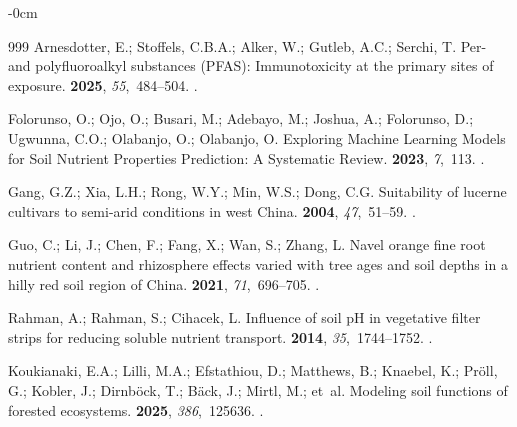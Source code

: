 \documentclass[environremediat,article,accept,pdftex,oneauthor]{Definitions/mdpi}
\begin{document}
\begin{adjustwidth}{-\extralength}{0cm}
\begin{thebibliography}{999}
Arnesdotter, E.; Stoffels, C.B.A.; Alker, W.; Gutleb, A.C.; Serchi, T.
\newblock Per- and polyfluoroalkyl substances (PFAS): Immunotoxicity at the
  primary sites of exposure.
 {\bf 2025}, {\em 55},~484--504.
.

Folorunso, O.; Ojo, O.; Busari, M.; Adebayo, M.; Joshua, A.; Folorunso, D.;
  Ugwunna, C.O.; Olabanjo, O.; Olabanjo, O.
\newblock Exploring Machine Learning Models for Soil Nutrient Properties
  Prediction: A Systematic Review.
 {\bf 2023}, {\em 7},~113.
.

Gang, G.Z.; Xia, L.H.; Rong, W.Y.; Min, W.S.; Dong, C.G.
\newblock Suitability of lucerne cultivars to semi-arid conditions in west
  China.
 {\bf 2004}, {\em
  47},~51--59.
.

Guo, C.; Li, J.; Chen, F.;  Fang, X.; Wan, S.; Zhang, L.
\newblock Navel orange fine root nutrient content and rhizosphere effects
  varied with tree ages and soil depths in a hilly red soil region of China.
 {\bf 2021}, {\em
  71},~696--705.
.

Rahman, A.; Rahman, S.; Cihacek, L.
\newblock Influence of soil pH in vegetative filter strips for reducing soluble
  nutrient transport.
 {\bf 2014}, {\em 35},~1744--1752.
.

Koukianaki, E.A.; Lilli, M.A.; Efstathiou, D.; Matthews, B.; Knaebel, K.; Pröll, G.; Kobler, J.; Dirnböck, T.; Bäck, J.; Mirtl, M.;  et~al.
\newblock Modeling soil functions of forested ecosystems.
 {\bf 2025}, {\em
  386},~125636.
.


\end{thebibliography}
\end{adjustwidth}
\end{document}
